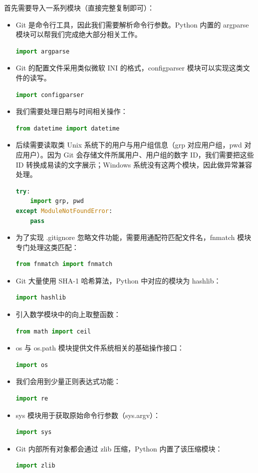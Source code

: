 \documentclass{ctexart}
\theoremstyle{remark}
\theoremstyle{warningstyle}
\theoremstyle{warningstyle}
\begin{document}
首先需要导入一系列模块（直接完整复制即可）：
\begin{itemize}
\item Git 是命令行工具，因此我们需要解析命令行参数。Python 内置的 argparse 模块可以帮我们完成绝大部分相关工作。
\begin{lstlisting}[language=Python]
import argparse
\end{lstlisting}
\item Git 的配置文件采用类似微软 INI 的格式，configparser 模块可以实现这类文件的读写。
\begin{lstlisting}[language=Python]
import configparser
\end{lstlisting}
\item 我们需要处理日期与时间相关操作：
\begin{lstlisting}[language=Python]
from datetime import datetime
\end{lstlisting}
\item 后续需要读取类 Unix 系统下的用户与用户组信息（grp 对应用户组，pwd 对应用户）。因为 Git 会存储文件所属用户、用户组的数字 ID，我们需要把这些 ID 转换成易读的文字展示；Windows 系统没有这两个模块，因此做异常兼容处理。
\begin{lstlisting}[language=Python]
try:
    import grp, pwd
except ModuleNotFoundError:
    pass
\end{lstlisting}
\item 为了实现 .gitignore 忽略文件功能，需要用通配符匹配文件名，fnmatch 模块专门处理这类匹配：
\begin{lstlisting}[language=Python]
from fnmatch import fnmatch
\end{lstlisting}
\item Git 大量使用 SHA-1 哈希算法，Python 中对应的模块为 hashlib：
\begin{lstlisting}[language=Python]
import hashlib
\end{lstlisting}
\item 引入数学模块中的向上取整函数：
\begin{lstlisting}[language=Python]
from math import ceil
\end{lstlisting}
\item os 与 os.path 模块提供文件系统相关的基础操作接口：
\begin{lstlisting}[language=Python]
import os
\end{lstlisting}
\item 我们会用到少量正则表达式功能：
\begin{lstlisting}[language=Python]
import re
\end{lstlisting}
\item sys 模块用于获取原始命令行参数（sys.argv）：
\begin{lstlisting}[language=Python]
import sys
\end{lstlisting}
\item Git 内部所有对象都会通过 zlib 压缩，Python 内置了该压缩模块：
\begin{lstlisting}[language=Python]
import zlib
\end{lstlisting}
\end{itemize}
\end{document}
